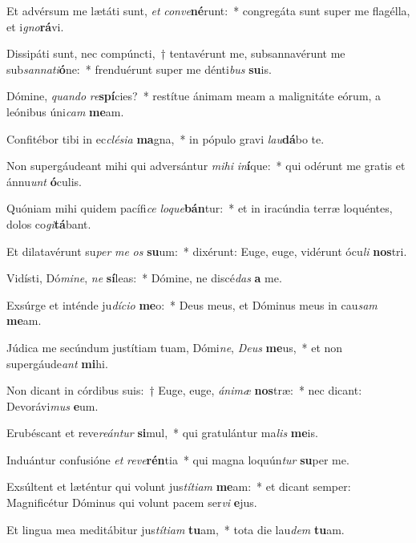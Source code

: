 \item Et advérsum me lætáti sunt, \textit{et} \textit{con}\textit{ve}\textbf{né}runt:~* congregáta sunt super me flagélla, et i\textit{gno}\textbf{rá}vi.
\item Dissipáti sunt, nec compúncti,~† tentavérunt me, subsannavérunt me sub\textit{san}\textit{na}\textit{ti}\textbf{ó}ne:~* frenduérunt super me dénti\textit{bus} \textbf{su}is.
\item Dómine, \textit{quan}\textit{do} \textit{re}\textbf{spí}cies?~* restítue ánimam meam a malignitáte eórum, a leónibus úni\textit{cam} \textbf{me}am.
\item Confitébor tibi in ec\textit{clé}\textit{si}\textit{a} \textbf{ma}gna,~* in pópulo gravi \textit{lau}\textbf{dá}bo te.
\item Non supergáudeant mihi qui adversántur \textit{mi}\textit{hi} \textit{in}\textbf{í}que:~* qui odérunt me gratis et ánnu\textit{unt} \textbf{ó}culis.
\item Quóniam mihi quidem pacífi\textit{ce} \textit{lo}\textit{que}\textbf{bán}tur:~* et in iracúndia terræ loquéntes, dolos co\textit{gi}\textbf{tá}bant.
\item Et dilatavérunt su\textit{per} \textit{me} \textit{os} \textbf{su}um:~* dixérunt: Euge, euge, vidérunt ócu\textit{li} \textbf{nos}tri.
\item Vidísti, Dó\textit{mi}\textit{ne}, \textit{ne} \textbf{sí}leas:~* Dómine, ne discé\textit{das} \textbf{a} me.
\item Exsúrge et inténde ju\textit{dí}\textit{ci}\textit{o} \textbf{me}o:~* Deus meus, et Dóminus meus in cau\textit{sam} \textbf{me}am.
\item Júdica me secúndum justítiam tuam, Dómi\textit{ne}, \textit{De}\textit{us} \textbf{me}us,~* et non supergáude\textit{ant} \textbf{mi}hi.
\item Non dicant in córdibus suis:~† Euge, euge, \textit{á}\textit{ni}\textit{mæ} \textbf{nos}træ:~* nec dicant: Devorávi\textit{mus} \textbf{e}um.
\item Erubéscant et reve\textit{re}\textit{án}\textit{tur} \textbf{si}mul,~* qui gratulántur ma\textit{lis} \textbf{me}is.
\item Induántur confusióne \textit{et} \textit{re}\textit{ve}\textbf{rén}tia~* qui magna loquún\textit{tur} \textbf{su}per me.
\item Exsúltent et læténtur qui volunt jus\textit{tí}\textit{ti}\textit{am} \textbf{me}am:~* et dicant semper: Magnificétur Dóminus qui volunt pacem ser\textit{vi} \textbf{e}jus.
\item Et lingua mea meditábitur jus\textit{tí}\textit{ti}\textit{am} \textbf{tu}am,~* tota die lau\textit{dem} \textbf{tu}am.
